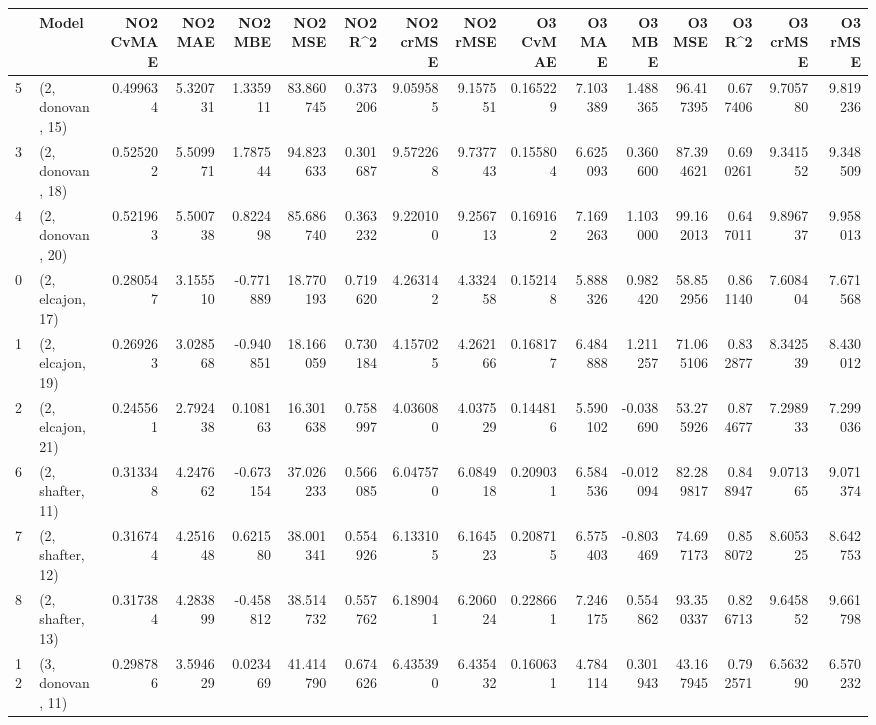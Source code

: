 \begin{tabular}{llrrrrrrrrrrrrrr}
\toprule
{} &             Model &  NO2 CvMAE &   NO2 MAE &   NO2 MBE &    NO2 MSE &   NO2 R\textasciicircum2 &  NO2 crMSE &  NO2 rMSE &  O3 CvMAE &     O3 MAE &    O3 MBE &      O3 MSE &    O3 R\textasciicircum2 &   O3 crMSE &    O3 rMSE \\
\midrule
5  &  (2, donovan, 15) &   0.499634 &  5.320731 &  1.335911 &  83.860745 &  0.373206 &   9.059585 &  9.157551 &  0.165229 &   7.103389 &  1.488365 &   96.417395 &  0.677406 &   9.705780 &   9.819236 \\
3  &  (2, donovan, 18) &   0.525202 &  5.509971 &  1.787544 &  94.823633 &  0.301687 &   9.572268 &  9.737743 &  0.155804 &   6.625093 &  0.360600 &   87.394621 &  0.690261 &   9.341552 &   9.348509 \\
4  &  (2, donovan, 20) &   0.521963 &  5.500738 &  0.822498 &  85.686740 &  0.363232 &   9.220100 &  9.256713 &  0.169162 &   7.169263 &  1.103000 &   99.162013 &  0.647011 &   9.896737 &   9.958013 \\
0  &  (2, elcajon, 17) &   0.280547 &  3.155510 & -0.771889 &  18.770193 &  0.719620 &   4.263142 &  4.332458 &  0.152148 &   5.888326 &  0.982420 &   58.852956 &  0.861140 &   7.608404 &   7.671568 \\
1  &  (2, elcajon, 19) &   0.269263 &  3.028568 & -0.940851 &  18.166059 &  0.730184 &   4.157025 &  4.262166 &  0.168177 &   6.484888 &  1.211257 &   71.065106 &  0.832877 &   8.342539 &   8.430012 \\
2  &  (2, elcajon, 21) &   0.245561 &  2.792438 &  0.108163 &  16.301638 &  0.758997 &   4.036080 &  4.037529 &  0.144816 &   5.590102 & -0.038690 &   53.275926 &  0.874677 &   7.298933 &   7.299036 \\
6  &  (2, shafter, 11) &   0.313348 &  4.247662 & -0.673154 &  37.026233 &  0.566085 &   6.047570 &  6.084918 &  0.209031 &   6.584536 & -0.012094 &   82.289817 &  0.848947 &   9.071365 &   9.071374 \\
7  &  (2, shafter, 12) &   0.316744 &  4.251648 &  0.621580 &  38.001341 &  0.554926 &   6.133105 &  6.164523 &  0.208715 &   6.575403 & -0.803469 &   74.697173 &  0.858072 &   8.605325 &   8.642753 \\
8  &  (2, shafter, 13) &   0.317384 &  4.283899 & -0.458812 &  38.514732 &  0.557762 &   6.189041 &  6.206024 &  0.228661 &   7.246175 &  0.554862 &   93.350337 &  0.826713 &   9.645852 &   9.661798 \\
12 &  (3, donovan, 11) &   0.298786 &  3.594629 &  0.023469 &  41.414790 &  0.674626 &   6.435390 &  6.435432 &  0.160631 &   4.784114 &  0.301943 &   43.167945 &  0.792571 &   6.563290 &   6.570232 \\

\end{tabular}
